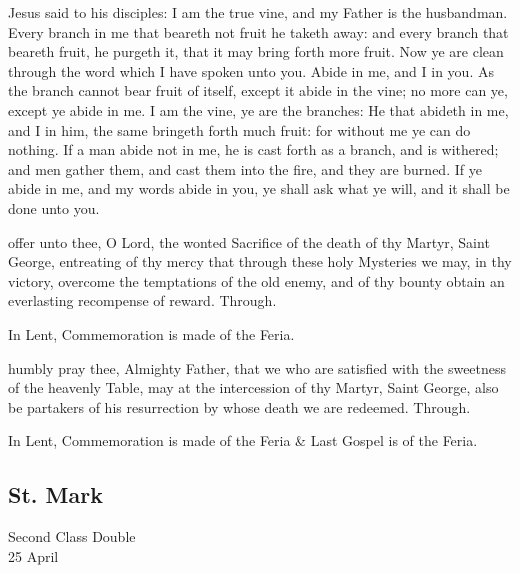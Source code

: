 \clearpage
{}
 Jesus said to his disciples: I am the true vine, and my Father is the husbandman. Every branch in me that beareth not fruit he taketh away: and every branch that beareth fruit, he purgeth it, that it may bring forth more fruit. Now ye are clean through the word which I have spoken unto you. Abide in me, and I in you. As the branch cannot bear fruit of itself, except it abide in the vine; no more can ye, except ye abide in me. I am the vine, ye are the branches: He that abideth in me, and I in him, the same bringeth forth much fruit: for without me ye can do nothing. If a man abide not in me, he is cast forth as a branch, and is withered; and men gather them, and cast them into the fire, and they are burned. If ye abide in me, and my words abide in you, ye shall ask what ye will, and it shall be done unto you.

\secret
{} offer unto thee, O Lord, the wonted Sacrifice of the death of thy Martyr, Saint George, entreating of thy mercy that through these holy Mysteries we may, in thy victory, overcome the temptations of the old enemy, and of thy bounty obtain an everlasting recompense of reward. Through.
\begin{rubric}
    In Lent, Commemoration is made of the Feria.%
\end{rubric}


\postcommunion
{} humbly pray thee, Almighty Father, that we who are satisfied with the sweetness of the heavenly Table, may at the intercession of thy Martyr, Saint George, also be partakers of his resurrection by whose death we are redeemed. Through.
\begin{rubric}
    In Lent, Commemoration is made of the Feria \& Last Gospel is of the Feria.
\end{rubric}


\clearpage
\subsection{St. Mark}
\begin{inhead}
    {Second Class Double\\
25 April}
\end{inhead}

